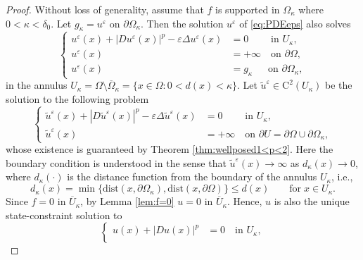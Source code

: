 \documentclass[12pt,reqno]{amsart}
\numberwithin{figure}{section}
\theoremstyle{plain}
\theoremstyle{remark}
\numberwithin{equation}{section}
\begin{document}
\begin{proof} Without loss of generality, assume that $f$ is supported in $\Omega_\kappa$ where $0<\kappa < \delta_{0}$.
Let $g_\kappa = u^\varepsilon$ on $\partial\Omega_{\kappa}$. Then the solution $u^\varepsilon$ of \eqref{eq:PDEeps} also solves
\begin{equation*}
    \left\{
  \begin{aligned}
  u^\varepsilon(x) + |Du^\varepsilon(x)|^p-\varepsilon \Delta u^\varepsilon(x) &=0 \;\qquad \text{in } U_\kappa ,\\
  u^\varepsilon(x) &= +\infty \quad \text{on } \partial \Omega,\\
  u^\varepsilon(x) &= g_\kappa \;\;\quad \text{on } \partial \Omega_{\kappa},
    \end{aligned}
\right.
\end{equation*}
in the annulus $U_\kappa= \Omega \setminus \overline{\Omega}_{\kappa} = \{x\in \Omega: 0< d(x) < \kappa\}$. Let $\tilde{u}^\varepsilon\in \mathrm{C}^2(U_\kappa)$ be the solution to the following problem
\begin{equation*}
    \left\{
        \begin{aligned}
            \tilde{u}^\varepsilon(x) + |D\tilde{u}^\varepsilon(x)|^p-\varepsilon \Delta \tilde{u}^\varepsilon(x) &=0 \;\qquad \text{in } U_\kappa ,\\
            \tilde{u}^\varepsilon(x) &= +\infty \quad \text{on } \partial U = \partial \Omega\cup \partial \Omega_{\kappa},
        \end{aligned}
    \right.
\end{equation*}
whose existence is guaranteed by Theorem \ref{thm:wellposed1<p<2}.
Here the boundary condition is understood in the sense that $\tilde{u}^\varepsilon(x)\to \infty$ as $d_\kappa(x)\to 0$, where $d_\kappa(\cdot)$ is the distance function from the boundary of the annulus $U_\kappa$, i.e.,
\begin{equation*}
    d_\kappa(x) = \min \big\lbrace \mathrm{dist}(x,\partial \Omega_\kappa),\mathrm{dist}(x,\partial\Omega)  \big\rbrace \leq d(x) \qquad\text{for}\;x\in U_\kappa.
\end{equation*}
Since $f = 0$ in $\overline{U}_\kappa$, by Lemma \ref{lem:f=0} $u=0$ in $\overline{U}_\kappa$. Hence, $u$ is also the unique state-constraint solution to
\begin{equation*}
    \left\{
        \begin{aligned}
            u(x)+ |Du(x)|^p &=0 \quad \text{in } U_\kappa ,\\

\end{aligned}
\end{equation*}
\end{proof}
\end{document}
